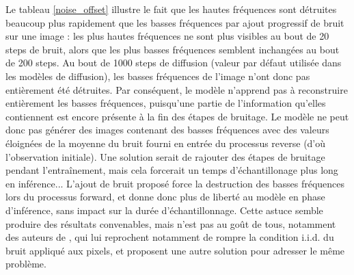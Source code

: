 \documentclass{article}
\begin{document}
\indent Le tableau \ref{noise_offset} illustre le fait que les hautes fréquences sont détruites beaucoup plus rapidement que les basses fréquences par ajout progressif de bruit sur une image : les plus hautes fréquences ne sont plus visibles au bout de 20 steps de bruit, alors que les plus basses fréquences semblent inchangées au bout de 200 steps. Au bout de 1000 steps de diffusion (valeur par défaut utilisée dans les modèles de diffusion), les basses fréquences de l'image n'ont donc pas entièrement été détruites. Par conséquent, le modèle n'apprend pas à reconstruire entièrement les basses fréquences, puisqu'une partie de l'information qu'elles contiennent est encore présente à la fin des étapes de bruitage. Le modèle ne peut donc pas générer des images contenant des basses fréquences avec des valeurs éloignées de la moyenne du bruit fourni en entrée du processus reverse (d'où l'observation initiale). Une solution serait de rajouter des étapes de bruitage pendant l'entraînement, mais cela forcerait un temps d'échantillonage plus long en inférence... L'ajout de bruit proposé force la destruction des basses fréquences lors du processus forward, et donne donc plus de liberté au modèle en phase d'inférence, sans impact sur la durée d'échantillonnage. Cette astuce semble produire des résultats convenables, mais n'est pas au goût de tous, notamment des auteurs de \cite{lin2023common}, qui lui reprochent notamment de rompre la condition i.i.d. du bruit appliqué aux pixels, et proposent une autre solution pour adresser le même problème.
\end{document}
